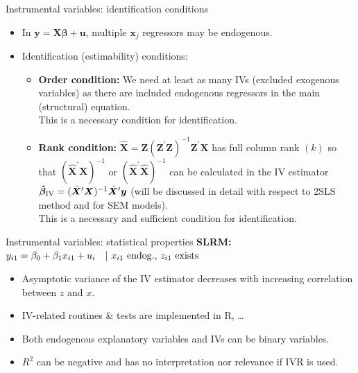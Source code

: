 \documentclass[usenames,dvipsnames]{beamer}
\begin{document}
\begin{frame}{Instrumental variables: identification conditions}
\begin{itemize} 
\item In $\bm{y} = \bm{X\beta}+\bm{u}$, multiple $\bm{x}_j$ regressors may be endogenous.
\medskip
\item Identification (estimability) conditions:
\medskip
\begin{itemize} 
\item \textbf{Order condition:} We need at least as many IVs (excluded exogenous variables) as there are included endogenous regressors in the main (structural) equation.  
\\ \medskip This is a necessary condition for identification. 
\bigskip
\item \textbf{Rank condition:} $\hat{\bm{X}} = 
\bm{Z}(\bm{Z}^{\prime}\bm{Z})^{-1} \bm{Z}^{\prime}\bm{X}$ has full column rank $(k)$ so that $(\hat{\bm{X}}^{\prime}\bm{X})^{-1}$ or $(\hat{\bm{X}}^{\prime}\hat{\bm{X}})^{-1}$ can be calculated in the IV estimator $\bm{\hat{\beta}}_{\textnormal{IV}} =  (\hat{\bm{X}}^{\prime}\bm{X})^{-1} \hat{\bm{X}}^{\prime}\bm{y}$ (will be discussed in detail with respect to 2SLS method and for SEM models).
\\ \medskip This is a necessary and sufficient condition for identification. 
\end{itemize}
\end{itemize}
\end{frame}
\begin{frame}{Instrumental variables: statistical properties}
\textbf{SLRM:} $y_{i1} = \beta_0 + \beta_1 x_{i1} + u_i \quad |~x_{i1} \textnormal{~endog.,~} z_{i1} \textnormal{~exists}$
\bigskip
\begin{itemize}
\item Asymptotic variance of the IV estimator decreases with increasing correlation between $z$ and $x$. 
\medskip
\item IV-related routines \& tests are implemented in R, \dots 
\medskip
\item Both endogenous explanatory variables and IVs can be binary variables.
\medskip
\item $R^2$ can be negative and has no interpretation nor relevance if IVR is used.
\end{itemize}
\end{frame}
\end{document}
